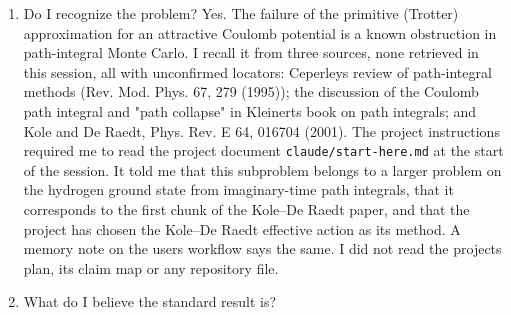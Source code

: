 \documentclass[11pt,a4paper]{article}
\providecommand{\passthrough}[1]{#1}
\begin{document}
\begin{enumerate}
\def\labelenumi{\arabic{enumi}.}
\item
  Do I recognize the problem? Yes. The failure of the primitive (Trotter) approximation for an attractive Coulomb potential is a known obstruction in path-integral Monte Carlo. I recall it from three sources, none retrieved in this session, all with unconfirmed locators: Ceperley\textquotesingle s review of path-integral methods (Rev. Mod. Phys. 67, 279 (1995)); the discussion of the Coulomb path integral and "path collapse" in Kleinert\textquotesingle s book on path integrals; and Kole and De Raedt, Phys. Rev. E 64, 016704 (2001). The project instructions required me to read the project document \passthrough{\lstinline!claude/start-here.md!} at the start of the session. It told me that this subproblem belongs to a larger problem on the hydrogen ground state from imaginary-time path integrals, that it corresponds to the first chunk of the Kole--De Raedt paper, and that the project has chosen the Kole--De Raedt effective action as its method. A memory note on the user\textquotesingle s workflow says the same. I did not read the project\textquotesingle s plan, its claim map or any repository file.
\item
  What do I believe the standard result is?


\end{enumerate}
\end{document}
